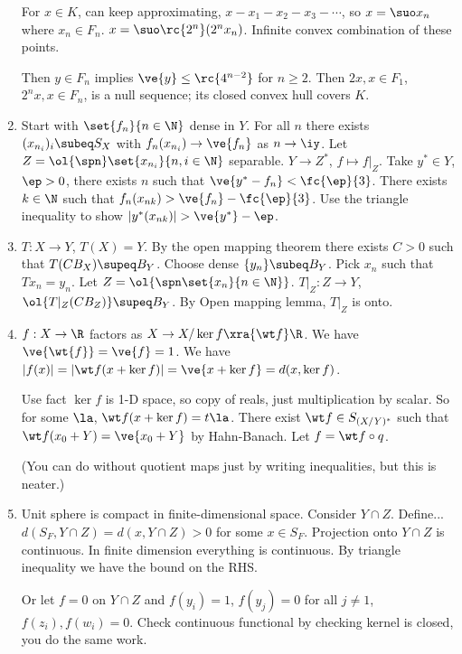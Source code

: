 \begin{enumerate}

For $x\in K$, can keep approximating, $x-x_1-x_2-x_3-\cdots$, so $x=\suo x_n$ where $x_n\in F_n$.  $x=\suo \rc{2^n} (2^nx_n)$. Infinite convex combination of these points.

Then $y\in F_n$ implies $\ve{y}\le \rc{4^{n-2}}$ for $n\ge 2$. Then $2x,x\in F_1$, $2^nx,x\in F_{n}$, is a null sequence; its closed convex hull covers $K$.

\item Start with $\set{f_n}{n\in\N}$ dense in $Y$. For all $n$ there exists $(x_{n_i})_i\subeq S_X$ with $f_n(x_{n_i})\to \ve{f_n}$ as $n\to \iy$. Let $Z=\ol{\spn}\set{x_{n_i}}{n,i\in \N}$ separable. $Y\to Z^*$, $f\mapsto f|_Z$. Take $y^*\in Y$, $\ep>0$, there exists $n$ such that $\ve{y^*-f_n}<\fc{\ep}{3}$. There exists $k\in \N$ such that $f_n(x_{nk})>\ve{f_n}-\fc{\ep}{3}$. Use the triangle inequality to show $|y^*(x_{nk})|>\ve{y^*}-\ep$.
\item $T:X\to Y$, $T(X)=Y$. By the open mapping theorem there exists $C>0$ such that $T(CB_X)\supeq B_Y$. 
Choose dense $\{y_n\}\subeq B_Y$. Pick $x_n$ such that $Tx_n=y_n$. Let $Z=\ol{\spn\set{x_n}{n\in \N}}$. 
$T|_Z:Z\to Y$, $\ol{T|_Z(CB_Z)}\supeq B_Y$. By Open mapping lemma, $T|_Z$ is onto.
\item
 $f:X\to \R$ factors as $X\to X/\ker f\xra{\wt f} \R$. We have $\ve{\wt{f}}=\ve{f}=1$. We have $|f(x)|=|\wt f(x+\ker f)|=\ve{x+\ker f}=d(x,\ker f)$. %

Use fact $\ker f$ is 1-D space, so copy of reals, just multiplication by scalar. So for some $\la$, $\wt f(x+\ker f)=t\la$. There exist $\wt f\in S_{(X/Y)^*}$ such that $\wt f(x_0+Y)=\ve{x_0+Y}$ by Hahn-Banach. Let $f=\wt f\circ q$.

(You can do without quotient maps just by writing inequalities, but this is neater.)
\item
Unit sphere is compact in finite-dimensional space.
Consider $Y\cap Z$. Define... $d(S_F,Y\cap Z)=d(x,Y\cap Z)>0$ for some $x\in S_F$. Projection onto $Y\cap Z$ is continuous. In finite dimension everything is continuous. By triangle inequality we have the bound on the RHS.

Or let $f=0$ on $Y\cap Z$ and $f(y_i)=1$, $f(y_j)=0$ for all $j\ne 1$, $f(z_i), f(w_i)=0$. Check continuous functional by checking kernel is closed, you do the same work.


\end{enumerate}

